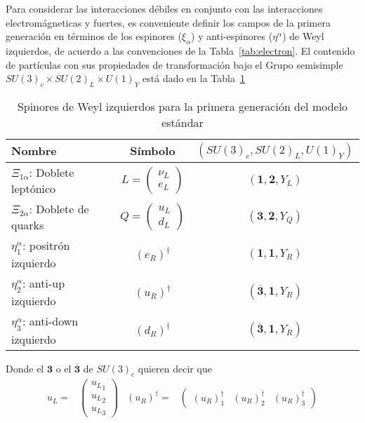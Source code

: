 \begin{frame}
Para considerar las interacciones débiles en conjunto con las interacciones electromágneticas y fuertes, es conveniente definir los campos de la primera generación en términos de los espinores ($\xi_{\alpha}$) y anti-espinores ($\eta^{\alpha}$) de Weyl izquierdos, de acuerdo a las convenciones de la Tabla~\ref{tab:electron}. El contenido de partículas con sus propiedades de transformación bajo el Grupo semisimple $SU(3)_c\times SU(2)_L\times U(1)_Y$ está dado en la Tabla~\ref{tab:fgw}
\begin{table}
  \centering
  \begin{tabular}{l|c|c}\hline
    Nombre & Símbolo & $\left( SU(3)_c, SU(2)_L, U(1)_Y \right)$\\\hline
    $\Xi_{1\alpha}$: Doblete leptónico & $L=\displaystyle{\begin{pmatrix}
      \nu_L\\
      e_L      
    \end{pmatrix}}$ & $\left( \mathbf{1},\mathbf{2},Y_L \right)$\\
    $\Xi_{2\alpha}$: Doblete de quarks & $Q=\displaystyle{\begin{pmatrix}
      u_L\\
      d_L      
    \end{pmatrix}}$ & $\left( \mathbf{3},\mathbf{2},Y_Q \right)$\\
   $\eta^{\alpha}_1$: positrón izquierdo & $\left( e_R \right)^{\dagger}$&$\left(\mathbf{1},\mathbf{1},Y_{R}\right)$ \\
   $\eta^{\alpha}_2$: anti-up izquierdo & $\left( u_R \right)^{\dagger}$&$\left(\overline{\mathbf{3}},\mathbf{1},Y_{R}\right)$ \\
   $\eta^{\alpha}_3$: anti-down izquierdo & $\left( d_R \right)^{\dagger}$&$\left(\overline{\mathbf{3}},\mathbf{1},Y_{R}\right)$ \\
  \end{tabular}
  \caption{Spinores de Weyl izquierdos para la primera generación del modelo estándar}
  \label{tab:fgw}
\end{table}

Donde el $\mathbf{3}$ o el $\overline{\mathbf{3}}$ de $SU(3)_c$ quieren decir que
\begin{align}
u_L=&
\begin{pmatrix}
  {u_{L}}_1\\
  {u_{L}}_2\\
  {u_{L}}_3
\end{pmatrix}&
  \left( u_R \right)^{\dagger}=&
  \begin{pmatrix}
    \left( u_R \right)^{\dagger}_1&
        \left( u_R \right)^{\dagger}_2&    \left( u_R \right)^{\dagger}_3
  \end{pmatrix}
\end{align}



\end{frame}
